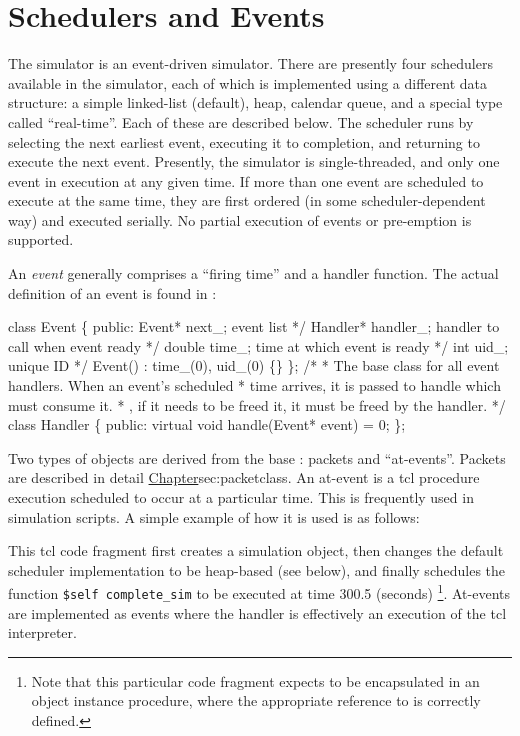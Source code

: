 \section{Schedulers and Events}
\label{sec:sched}

The simulator is an event-driven simulator.
There are presently four schedulers available in the simulator, each
of which is implemented using a different data structure:
a simple linked-list (default), heap, calendar queue, and a special
type called ``real-time''.  Each of these are described below.
The scheduler runs by selecting the next earliest event, executing
it to completion, and returning to execute the next event.
Presently, the simulator is single-threaded, and only one event
in execution at any given time.
If more than one event are scheduled to execute at the same time,
they are first ordered (in some scheduler-dependent way) and executed
serially.
No partial execution of events or pre-emption is supported.

An {\em event} generally comprises a ``firing time'' and a handler function.
The actual definition of an event is found in :
\begin{program}
        class Event \{ 
        public: 
                Event* next_;           \* event list */ 
                Handler* handler_;      \* handler to call when event ready */
                double time_;           \* time at which event is ready */
                int uid_;               \* unique ID */
                Event() : time_(0), uid_(0) \{\}
        \};   
        /*   
         * {\cf The base class for all event handlers.  When an event's scheduled}
         * {\cf time arrives, it is passed to handle which must consume it.}
         * {\ie, if it needs to be freed it, it must be freed by the handler.}
         */  
        class Handler \{
         public: 
                virtual void handle(Event* event) = 0;
        \};   
\end{program}
Two types of objects are derived from the base
: packets and ``at-events''.
Packets are described in detail 
\href{in the next chapter}{Chapter}{sec:packetclass}.
An at-event is a tcl procedure execution scheduled to occur at
a particular time. 
This is frequently used in simulation scripts.
A simple example of how it is used is as follows:
This tcl code fragment first creates a simulation object,
then changes the default scheduler implementation to be heap-based
(see below), and finally schedules the function {\tt \$self complete\_sim}
to be executed at time 300.5 (seconds)%
\footnote{Note that this particular code fragment expects to be encapsulated 
in an object instance procedure, where the appropriate
reference to  is correctly defined.}.
At-events are implemented as events where the handler is
effectively an execution of the tcl interpreter.

